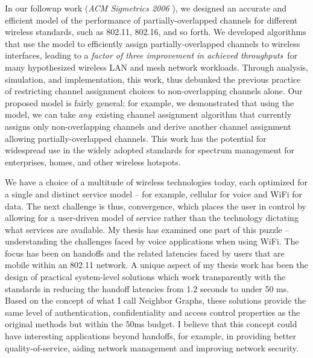 \documentclass[11pt,letterpaper]{article}
\begin{document}
In our followup work ({\it ACM Sigmetrics 2006 \cite{sigm2006}}), we designed an accurate and efficient model of the performance of
partially-overlapped channels for different wireless standards, such as 802.11, 802.16, and so forth. We developed
algorithms that use the model to efficiently assign partially-overlapped channels to wireless interfaces, leading to a
{\em factor of three improvement in achieved throughputs}\ for many hypothesized wireless LAN and mesh network
workloads. Through analysis, simulation, and implementation, this work, thus debunked the previous practice of
restricting channel assignment choices to non-overlapping channels alone. Our proposed model is fairly general; for
example, we demonstrated that using the model, we can take {\em any}\ existing channel assignment algorithm that
currently assigns only non-overlapping channels and derive another channel assignment allowing partially-overlapped
channels. This work has the potential for widespread use in the widely adopted standards for spectrum management for
enterprises, homes, and other wireless hotspots.

We have a choice of a multitude of wireless technologies today, each optimized for a single and distinct service model -- for example, cellular for
voice and WiFi for data. The next challenge is thus, convergence, which places the user in control by 
allowing for a user-driven model of service rather than the technology dictating what services are available. My thesis has examined one part of this puzzle --
understanding the challenges faced by voice applications when using WiFi. The focus has been on handoffs and the related
latencies faced by users that are mobile within an 802.11 network. A unique aspect of my thesis work has been the design of
practical system-level solutions which work transparently with the standards in reducing the handoff latencies from 1.2
seconds to under 50 ms. Based on the concept of what I call Neighbor Graphs, these solutions provide the same level of 
authentication, confidentiality and access control properties as the original methods but within the 50ms budget. I believe that this
concept could have interesting applications beyond handoffs, for example, in providing better quality-of-service, aiding
network management and improving network security.
\end{document}
